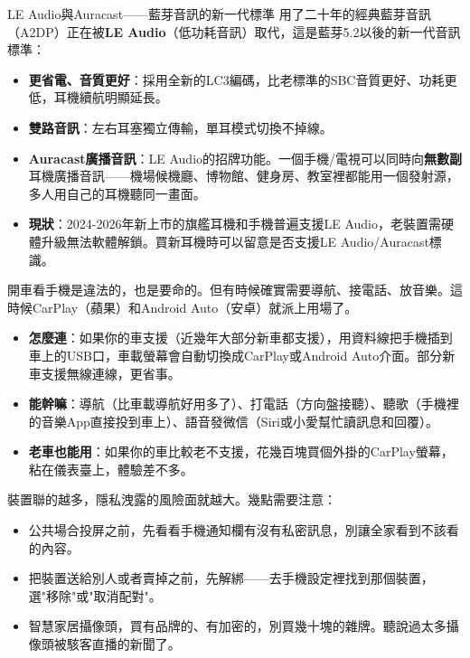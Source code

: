 \begin{tcbinfo}{LE Audio與Auracast——藍芽音訊的新一代標準}
用了二十年的經典藍芽音訊（A2DP）正在被\textbf{LE Audio}（低功耗音訊）取代，這是藍芽5.2以後的新一代音訊標準：

\begin{itemize}
  \item \textbf{更省電、音質更好}：採用全新的LC3編碼，比老標準的SBC音質更好、功耗更低，耳機續航明顯延長。
  \item \textbf{雙路音訊}：左右耳塞獨立傳輸，單耳模式切換不掉線。
  \item \textbf{Auracast廣播音訊}：LE Audio的招牌功能。一個手機/電視可以同時向\textbf{無數副}耳機廣播音訊——機場候機廳、博物館、健身房、教室裡都能用一個發射源，多人用自己的耳機聽同一畫面。
  \item \textbf{現狀}：2024-2026年新上市的旗艦耳機和手機普遍支援LE Audio，老裝置需硬體升級無法軟體解鎖。買新耳機時可以留意是否支援LE Audio/Auracast標識。
\end{itemize}

\end{tcbinfo}


開車看手機是違法的，也是要命的。但有時候確實需要導航、接電話、放音樂。這時候CarPlay（蘋果）和Android Auto（安卓）就派上用場了。

\begin{itemize}
  \item \textbf{怎麼連}：如果你的車支援（近幾年大部分新車都支援），用資料線把手機插到車上的USB口，車載螢幕會自動切換成CarPlay或Android Auto介面。部分新車支援無線連線，更省事。
  \item \textbf{能幹嘛}：導航（比車載導航好用多了）、打電話（方向盤接聽）、聽歌（手機裡的音樂App直接投到車上）、語音發微信（Siri或小愛幫忙讀訊息和回覆）。
  \item \textbf{老車也能用}：如果你的車比較老不支援，花幾百塊買個外掛的CarPlay螢幕，粘在儀表臺上，體驗差不多。
\end{itemize}


裝置聯的越多，隱私洩露的風險面就越大。幾點需要注意：

\begin{itemize}
  \item 公共場合投屏之前，先看看手機通知欄有沒有私密訊息，別讓全家看到不該看的內容。
  \item 把裝置送給別人或者賣掉之前，先解綁——去手機設定裡找到那個裝置，選"移除"或"取消配對"。
  \item 智慧家居攝像頭，買有品牌的、有加密的，別買幾十塊的雜牌。聽說過太多攝像頭被駭客直播的新聞了。
\end{itemize}

